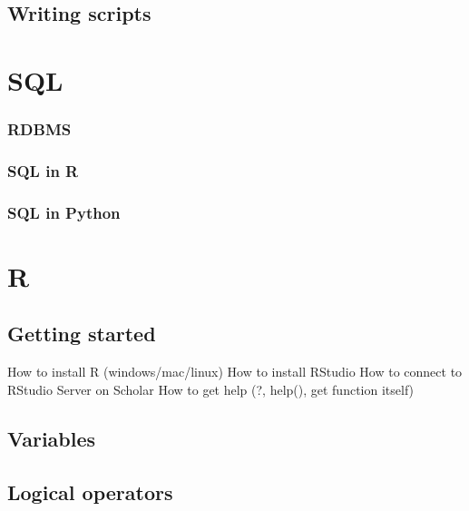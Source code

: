 \documentclass[
]{book}
\begin{document}
\hypertarget{writing-scripts}{%
\section{Writing scripts}\label{writing-scripts}}

\hypertarget{sql}{%
\chapter{SQL}\label{sql}}

\hypertarget{rdbms}{%
\subsection{RDBMS}\label{rdbms}}

\hypertarget{sql-in-r}{%
\subsection{SQL in R}\label{sql-in-r}}

\hypertarget{sql-in-python}{%
\subsection{SQL in Python}\label{sql-in-python}}

\hypertarget{r}{%
\chapter{R}\label{r}}

\hypertarget{getting-started-with-r}{%
\section{Getting started}\label{getting-started-with-r}}

How to install R (windows/mac/linux)
How to install RStudio
How to connect to RStudio Server on Scholar
How to get help (?, help(), get function itself)

\hypertarget{r-variables}{%
\section{Variables}\label{r-variables}}

\hypertarget{r-logical-operators}{%
\section{Logical operators}\label{r-logical-operators}}
\end{document}
